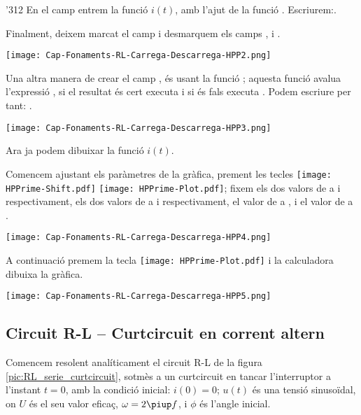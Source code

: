 \begin{exemple}
\begin{dingautolist}{'312}
            En el camp  entrem la funció $i(t)$, amb l'ajut de la funció  . Escriurem:\break {}.

            Finalment, deixem marcat el camp  i desmarquem els camps ,  i .

            \texttt{[image: Cap-Fonaments-RL-Carrega-Descarrega-HPP2.png]}

            Una altra manera de crear el camp , és usant la funció ; aquesta funció avalua l'expressió , si el resultat   és cert executa  i si és fals executa . Podem escriure per tant: .

            \texttt{[image: Cap-Fonaments-RL-Carrega-Descarrega-HPP3.png]}

        \item Ara ja podem dibuixar la funció $i(t)$.

            Comencem ajustant els paràmetres de la gràfica, prement les tecles \texttt{[image: HPPrime-Shift.pdf]} \texttt{[image: HPPrime-Plot.pdf]}; fixem els dos valors de  a  i  respectivament, els dos valors de  a  i  respectivament, el valor de  a , i el valor de  a .

            \texttt{[image: Cap-Fonaments-RL-Carrega-Descarrega-HPP4.png]}

        \item A continuació premem la tecla \texttt{[image: HPPrime-Plot.pdf]} i la calculadora dibuixa la gràfica.

            \texttt{[image: Cap-Fonaments-RL-Carrega-Descarrega-HPP5.png]}
    \end{dingautolist}
\end{exemple}


\subsection {Circuit R-L -- Curtcircuit en corrent altern}\label{sec:ccRL}

Comencem resolent analíticament el circuit R-L de la figura \vref{pic:RL_serie_curtcircuit}, sotmès a un curtcircuit en tancar l'interruptor a l'instant $t=0$, amb la condició inicial: $i(0) = 0$; $u(t)$ és una tensió sinusoïdal, on $U$ és el seu valor eficaç, $\omega = 2 \piup f$, i $\phi$ és l'angle inicial.

